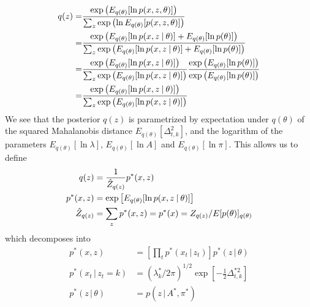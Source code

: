 \begin{align}
  \label{eq:qz}
  \begin{split}
    q(z) 
    = & 
    \frac{\exp \left( E_{q(\theta)}[\ln p(x, z, \theta)] \right)}
          {\sum_{z} \exp \left(\ln E_{q(\theta)}[p(x, z, \theta)] \right)} \\
    = &
    \frac{\exp 
          \left( 
            E_{q(\theta)}[\ln p(x, z \:|\: \theta)] 
            + E_{q(\theta)}[\ln p(\theta)] 
          \right)}
          {\sum_{z} 
          \exp 
          \left( 
            E_{q(\theta)}[\ln p(x, z \:|\: \theta)] 
            + E_{q(\theta)}[\ln p(\theta)] 
          \right)} \\
    = &
    \frac{\exp 
          \left( 
            E_{q(\theta)}[\ln p(x, z \:|\: \theta)] 
          \right)}
          {\sum_{z} 
          \exp 
          \left( 
            E_{q(\theta)}[\ln p(x, z \:|\: \theta)] 
          \right)}
    \frac{\exp 
          \left( 
            E_{q(\theta)}[\ln p(\theta)] 
          \right)}
          { 
          \exp 
          \left( 
            E_{q(\theta)}[\ln p(\theta)] 
          \right)}\\
    = &
    \frac{\exp 
          \left( 
            E_{q(\theta)}[\ln p(x, z \:|\: \theta)] 
          \right)}
          {\sum_{z} 
          \exp 
          \left( 
            E_{q(\theta)}[\ln p(x, z \:|\: \theta)] 
          \right)}
  \end{split}
\end{align}
We see that the posterior $q(z)$ is parametrized by expectation under $q(\theta)$ of the squared Mahalanobis distance $E_{q(\theta)}[\Delta_{t,k}^2]$, and the logarithm of the parameters $E_{q(\theta)}[\ln \lambda]$, $E_{q(\theta)}[\ln A]$ and $E_{q(\theta)}[\ln \pi]$. This allows us to define
\begin{align}
  \label{eq:q_z_star}
  \begin{split}
    q(z)
    &= \frac{1}{\hat{Z}_{q(z)}} p^*(x, z)\\
    p^*(x, z) 
    &= \exp \left[ E_{q(\theta)}[\ln p(x, z \:|\: \theta)] \right] \\
    \hat{Z}_{q(z)}
    &= \sum_{z} p^*(x, z)
    = p^*(x) = Z_{q(z)} / E[p(\theta)]_{q(\theta)}
  \end{split}
\end{align}
which decomposes into
\begin{align}
  p^*(x, z) 
  &= \left[ \prod_t p^*(x_{t} \,|\, z_{t}) \right] p^*(z \,|\, \theta) \\
  p^*(x_{t} \,|\, z_{t}=k) 
  &= (\lambda^*_{k}/2 \pi)^{1/2} \exp \left[-\tfrac{1}{2} \Delta_{t,k}^{*2} \right]\\
  p^*(z \,|\, \theta) &= p(z \,|\, A^*, \pi^*) 
\end{align}
